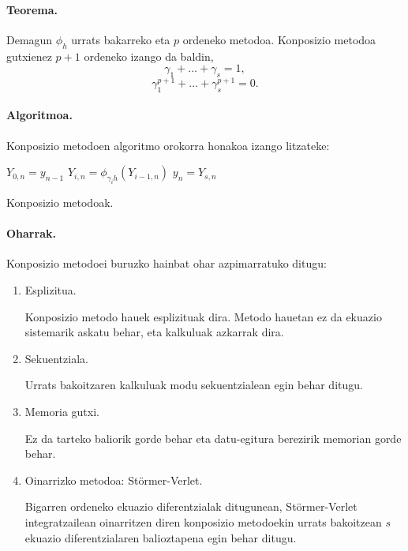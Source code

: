 \paragraph*{\textbf{Teorema}.}
Demagun $\phi_h$ urrats bakarreko eta $p$ ordeneko metodoa. Konposizio metodoa gutxienez $p+1$ ordeneko izango da baldin,
\[\gamma_1+\dots+\gamma_s=1,\] 
\begin{equation}
\gamma_1^{p+1}+\dots+\gamma_s^{p+1}=0.
\end{equation}

\paragraph*{\textbf{Algoritmoa}.}
Konposizio metodoen algoritmo orokorra honakoa izango litzateke:

\begin{algorithm}[H]
 \BlankLine
  {
   \BlankLine
    $Y_{0,n}=y_{n-1} $\;
    \BlankLine
   {
    \BlankLine 
    $Y_{i,n}=\phi_{\gamma_i h}(Y_{i-1,n})$\;
   }
   \BlankLine
    $y_{n}=Y_{s,n}$\;
   \BlankLine
 }
 \caption{Konposizio metodoak.}
\end{algorithm}
 
\paragraph*{Oharrak.}
Konposizio metodoei buruzko hainbat ohar azpimarratuko ditugu:
\begin{enumerate}
\item{Esplizitua.}

Konposizio metodo hauek esplizituak dira. Metodo hauetan ez da ekuazio sistemarik askatu behar, eta kalkuluak azkarrak dira. 

\item{Sekuentziala.}

Urrats bakoitzaren kalkuluak modu sekuentzialean egin behar ditugu.

\item{Memoria gutxi.}

Ez da tarteko baliorik gorde behar eta datu-egitura berezirik memorian gorde behar.   

\item{Oinarrizko metodoa: Störmer-Verlet.}

Bigarren ordeneko ekuazio diferentzialak ditugunean, Störmer-Verlet integratzailean oinarritzen diren konposizio metodoekin urrats bakoitzean $s$ ekuazio diferentzialaren balioztapena egin behar ditugu.

\end{enumerate}



